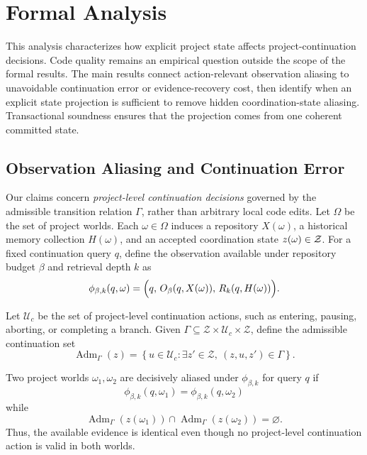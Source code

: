 
\section{Formal Analysis}
\label{sec:formal-analysis}

This analysis characterizes how explicit project state affects
project-continuation decisions.  Code quality remains an empirical question
outside the scope of the formal results.  The main results connect
action-relevant observation aliasing to unavoidable continuation error or
evidence-recovery cost, then identify when an explicit state projection is
sufficient to remove hidden coordination-state aliasing.  Transactional
soundness ensures that the projection comes from one coherent committed state.

\subsection{Observation Aliasing and Continuation Error}

Our claims concern \emph{project-level continuation decisions} governed by the
admissible transition relation $\Gamma$, rather than arbitrary local code edits.
Let $\Omega$ be the set of project worlds.  Each $\omega\in\Omega$ induces a
repository $X(\omega)$, a historical memory collection $H(\omega)$, and an
accepted coordination state $z(\omega)\in\mathcal{Z}$.  For a fixed continuation
query $q$, define the observation available under repository budget $\beta$ and
retrieval depth $k$ as
\begin{equation}
\phi_{\beta,k}(q,\omega)
=
\Bigl(
q,\,
O_\beta(q,X(\omega)),\,
R_k(q,H(\omega))
\Bigr).
\label{eq:observation-map}
\end{equation}

Let $\mathcal U_c$ be the set of project-level continuation actions, such as
entering, pausing, aborting, or completing a branch.  Given
$\Gamma\subseteq\mathcal Z\times\mathcal U_c\times\mathcal Z$, define the
admissible continuation set
\begin{equation}
\operatorname{Adm}_\Gamma(z)
=
\left\{
u\in\mathcal U_c:
\exists z'\in\mathcal Z,\ (z,u,z')\in\Gamma
\right\}.
\label{eq:admissible-set}
\end{equation}

\begin{definition}
Two project worlds $\omega_1,\omega_2$ are decisively aliased under
$\phi_{\beta,k}$ for query $q$ if
\begin{equation}
\phi_{\beta,k}(q,\omega_1)
=
\phi_{\beta,k}(q,\omega_2)
\label{eq:same-observation}
\end{equation}
while
\begin{equation}
\operatorname{Adm}_\Gamma(z(\omega_1))
\cap
\operatorname{Adm}_\Gamma(z(\omega_2))
=
\varnothing.
\label{eq:disjoint-actions}
\end{equation}
Thus, the available evidence is identical even though no project-level
continuation action is valid in both worlds.
\end{definition}

